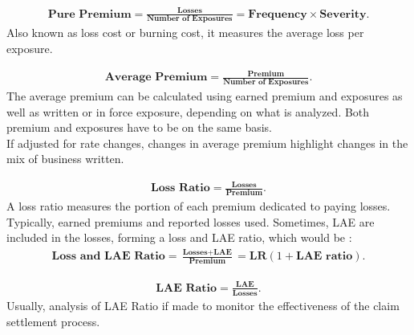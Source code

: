 \documentclass[11pt, english]{memoir}
\numberwithin{definition}{section}
\begin{document}
	
	\begin{tcolorbox}[adjusted title = \textbf{Pure Premium}, boxrule = 0mm]
		\begin{align*}
		\textbf{Pure Premium} = \frac{\textbf{Losses}}{\textbf{Number of Exposures}} = \textbf{Frequency} \times \textbf{Severity}.
		\end{align*}
		Also known as loss cost or burning cost, it measures the average loss per exposure.  
	\end{tcolorbox}
	
	
	\begin{tcolorbox}[adjusted title = \textbf{Average Premium}, boxrule = 0mm]
		\begin{align*}
		\textbf{Average Premium} = \frac{\textbf{Premium}}{\textbf{Number of Exposures}}.
		\end{align*}
		The average premium can be calculated using earned premium and exposures as well as written or in force exposure, depending on what is analyzed. Both premium and exposures have to be on the same basis. \\
		
		If adjusted for rate changes, changes in average premium highlight changes in the mix of business written. 
	\end{tcolorbox}
	
	
	\begin{tcolorbox}[adjusted title = \textbf{Loss Ratio}, boxrule = 0mm]
		\begin{align*}
		\textbf{Loss Ratio} = \frac{\textbf{Losses}}{\textbf{Premium}}.
		\end{align*}
		A loss ratio measures the portion of each premium dedicated to paying losses. Typically, earned premiums and reported losses used. Sometimes, LAE are included in the losses, forming a loss and LAE ratio, which would be : 
		\begin{align*}
		\textbf{Loss and LAE Ratio} = \frac{\textbf{Losses} + \textbf{LAE}}{\textbf{Premium}} = \textbf{LR}(1+\textbf{LAE ratio}).
		\end{align*}
	\end{tcolorbox}
	
	
	\begin{tcolorbox}[adjusted title = \textbf{Loss Adjustment Ratio}, boxrule = 0mm]
		\begin{align*}
		\textbf{LAE Ratio} = \frac{\textbf{LAE}}{\textbf{Losses}} .
		\end{align*}
		Usually, analysis of LAE Ratio if made to monitor the effectiveness of the claim settlement process. 
	\end{tcolorbox}
	
\end{document}
